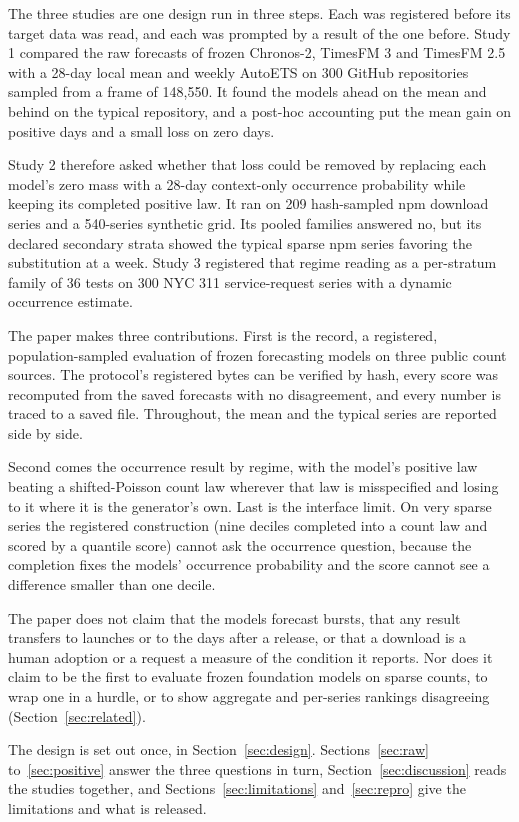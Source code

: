 The three studies are one design run in three steps. Each was registered before its target data was read, and
each was prompted by a result of the one before. Study 1 compared the raw forecasts of frozen Chronos-2,
TimesFM 3 and TimesFM 2.5 with a 28-day local mean and weekly AutoETS on 300 GitHub repositories sampled from
a frame of 148,550. It found the models ahead on the mean and behind on the typical repository, and a post-hoc
accounting put the mean gain on positive days and a small loss on zero days.

Study 2 therefore asked whether that loss could be removed by replacing each model's zero mass with a 28-day
context-only occurrence probability while keeping its completed positive law. It ran on 209 hash-sampled npm
download series and a 540-series synthetic grid. Its pooled families answered no, but its declared secondary
strata showed the typical sparse npm series favoring the substitution at a week. Study 3 registered that
regime reading as a per-stratum family of 36 tests on 300 NYC 311 service-request series with a dynamic
occurrence estimate.

The paper makes three contributions. First is the record, a registered, population-sampled evaluation of
frozen forecasting models on three public count sources. The protocol's registered bytes can be verified by
hash, every score was recomputed from the saved forecasts with no disagreement, and every number is traced to
a saved file. Throughout, the mean and the typical series are reported side by side.

Second comes the occurrence result by regime, with the model's positive law beating a shifted-Poisson count
law wherever that law is misspecified and losing to it where it is the generator's own. Last is the interface
limit. On very sparse series the registered construction (nine deciles completed into a count law and scored
by a quantile score) cannot ask the occurrence question, because the completion fixes the models' occurrence
probability and the score cannot see a difference smaller than one decile.

The paper does not claim that the models forecast bursts, that any result transfers to launches or to the days
after a release, or that a download is a human adoption or a request a measure of the condition it reports.
Nor does it claim to be the first to evaluate frozen foundation models on sparse counts, to wrap one in a
hurdle, or to show aggregate and per-series rankings disagreeing (Section~\ref{sec:related}).

The design is set out once, in Section~\ref{sec:design}. Sections~\ref{sec:raw} to~\ref{sec:positive} answer
the three questions in turn, Section~\ref{sec:discussion} reads the studies together, and
Sections~\ref{sec:limitations} and~\ref{sec:repro} give the limitations and what is released.
